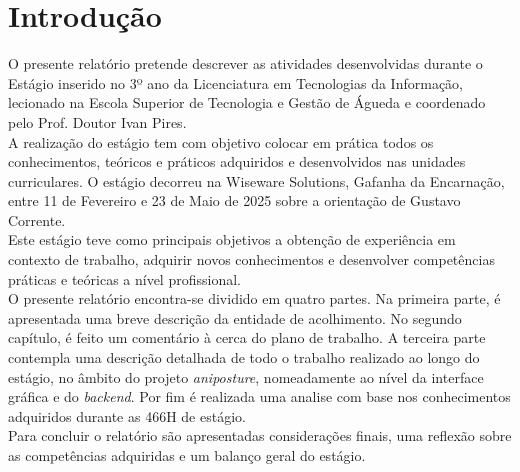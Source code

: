\chapter{Introdução}%
\label{chapter:introduction}

O presente relatório pretende descrever as atividades desenvolvidas durante o Estágio
inserido no 3º ano da Licenciatura em Tecnologias da Informação, lecionado na 
Escola Superior de Tecnologia e Gestão de Águeda e coordenado
pelo Prof. Doutor Ivan Pires.
\\

A realização do estágio tem com objetivo colocar em prática todos os conhecimentos,
teóricos e práticos adquiridos e desenvolvidos nas unidades curriculares.
O estágio decorreu na Wiseware Solutions, Gafanha da Encarnação, entre 11
de Fevereiro e 23 de Maio de 2025 sobre a orientação de
Gustavo Corrente.
\\

Este estágio teve como principais objetivos a obtenção de experiência em contexto de trabalho, adquirir novos conhecimentos e desenvolver competências práticas e teóricas a nível profissional. 
\\

O presente relatório encontra-se dividido em quatro partes. Na primeira parte, é apresentada uma breve descrição da entidade de acolhimento. No segundo capítulo, é feito um comentário à cerca do plano de trabalho. A terceira parte contempla uma descrição detalhada de todo o trabalho realizado ao longo do estágio, no âmbito do projeto \textit{aniposture}, nomeadamente ao nível da interface gráfica e do \textit{backend}. Por fim é realizada uma analise com base nos conhecimentos adquiridos durante as 466H de estágio.   
\\


Para concluir o relatório são apresentadas considerações finais, uma reflexão sobre as competências adquiridas e um balanço geral do estágio.

\begin{introduction}
\end{introduction}